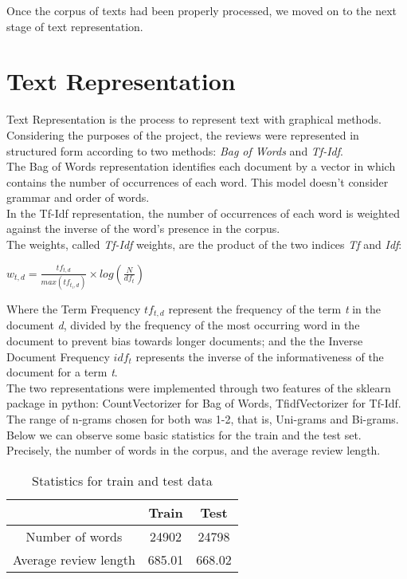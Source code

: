 \documentclass[fleqn,10pt]{SelfArx} %
\begin{document}

Once the corpus of texts had been properly processed, we moved on to the next stage of text representation.

\section{Text Representation}
Text Representation is the process to represent text with graphical methods. Considering the purposes of the project, the reviews were represented in structured form according to two methods: \textit{Bag of Words} and \textit{Tf-Idf}.\\
The Bag of Words representation identifies each document by a vector in which contains the number of occurrences of each word. This model doesn't consider grammar and order of words.\\
In the Tf-Idf representation, the number of occurrences of each word is weighted against the inverse of the word's presence in the corpus.\\
The weights, called \textit{Tf-Idf} weights, are the product of the two indices \textit{Tf} and \textit{Idf}:
\begin{center}
$w_{t,d} = \frac{tf_{t,d}}{max (tf_{t_i,d})} \times log(\frac{N}{df_t})$
\end{center}
Where the Term Frequency \textit{$tf_{t,d}$} represent the frequency of the term \textit{t} in the document \textit{d}, divided by the frequency of the most occurring word in the document to prevent bias towards longer documents; and the the Inverse Document Frequency \textit{$idf_t$} represents the inverse of the informativeness of the document for a term \textit{t}.\\
The two representations were implemented through two features of the sklearn package in python: CountVectorizer for Bag of Words, TfidfVectorizer for Tf-Idf. The range of n-grams chosen for both was 1-2, that is, Uni-grams and Bi-grams.\\
Below we can observe some basic statistics for the train and the test set. Precisely, the number of words in the corpus, and the average review length.

\begin{table}[ht]
\centering
\begin{tabular}{c c c }
	 & Train & Test  \\
	\hline
	Number of words & 24902 & 24798  \\
	Average review length & 685.01 & 668.02  \\
\end{tabular}
\caption{Statistics for train and test data}
\end{table}
\end{document}
